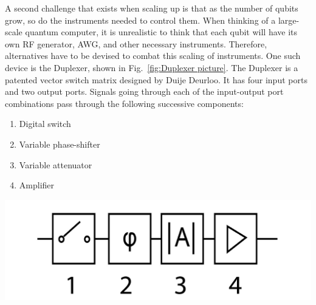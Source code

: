       A second challenge that exists when scaling up is that as the number of qubits grow, so do the instruments needed to control them. When thinking of a large-scale quantum computer, it is unrealistic to think that each qubit will have its own RF generator, AWG, and other necessary instruments. Therefore, alternatives have to be devised to combat this scaling of instruments. One such device is the Duplexer, shown in Fig.~\ref{fig:Duplexer picture}. The Duplexer is a patented vector switch matrix designed by Duije Deurloo. It has four input ports and two output ports. Signals going through each of the input-output port combinations pass through the following successive components:



    \begin{minipage}{.5\textwidth}
        \begin{enumerate}
        \item Digital switch
        \item Variable phase-shifter
        \item Variable attenuator
        \item Amplifier
      \end{enumerate}
    \end{minipage}%
    \begin{minipage}{0.5\textwidth}
        \includegraphics[width=\textwidth]{Figures/Duplexer_properties.jpg}
    \end{minipage}

